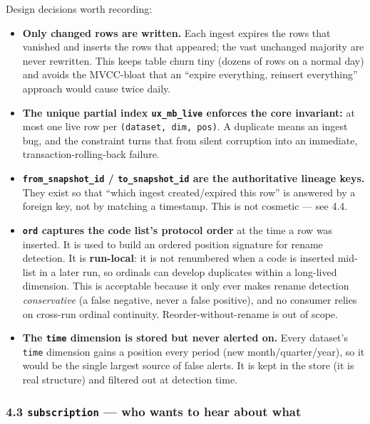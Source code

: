 \documentclass[
]{article}
\providecommand{\tightlist}{%
  \setlength{\itemsep}{0pt}\setlength{\parskip}{0pt}}
\begin{document}
Design decisions worth recording:

\begin{itemize}
\tightlist
\item
  \textbf{Only changed rows are written.} Each ingest expires the rows
  that vanished and inserts the rows that appeared; the vast unchanged
  majority are never rewritten. This keeps table churn tiny (dozens of
  rows on a normal day) and avoids the MVCC-bloat that an ``expire
  everything, reinsert everything'' approach would cause twice daily.
\item
  \textbf{The unique partial index \texttt{ux\_mb\_live} enforces the
  core invariant:} at most one live row per
  \texttt{(dataset,\ dim,\ pos)}. A duplicate means an ingest bug, and
  the constraint turns that from silent corruption into an immediate,
  transaction-rolling-back failure.
\item
  \textbf{\texttt{from\_snapshot\_id} / \texttt{to\_snapshot\_id} are
  the authoritative lineage keys.} They exist so that ``which ingest
  created/expired this row'' is answered by a foreign key, not by
  matching a timestamp. This is not cosmetic --- see 4.4.
\item
  \textbf{\texttt{ord} captures the code list's protocol order} at the
  time a row was inserted. It is used to build an ordered position
  signature for rename detection. It is \textbf{run-local}: it is not
  renumbered when a code is inserted mid-list in a later run, so
  ordinals can develop duplicates within a long-lived dimension. This is
  acceptable because it only ever makes rename detection
  \emph{conservative} (a false negative, never a false positive), and no
  consumer relies on cross-run ordinal continuity.
  Reorder-without-rename is out of scope.
\item
  \textbf{The \texttt{time} dimension is stored but never alerted on.}
  Every dataset's \texttt{time} dimension gains a position every period
  (new month/quarter/year), so it would be the single largest source of
  false alerts. It is kept in the store (it is real structure) and
  filtered out at detection time.
\end{itemize}

\subsubsection{\texorpdfstring{4.3 \texttt{subscription} --- who wants
to hear about
what}{4.3 subscription --- who wants to hear about what}}\label{subscription-who-wants-to-hear-about-what}
\end{document}
